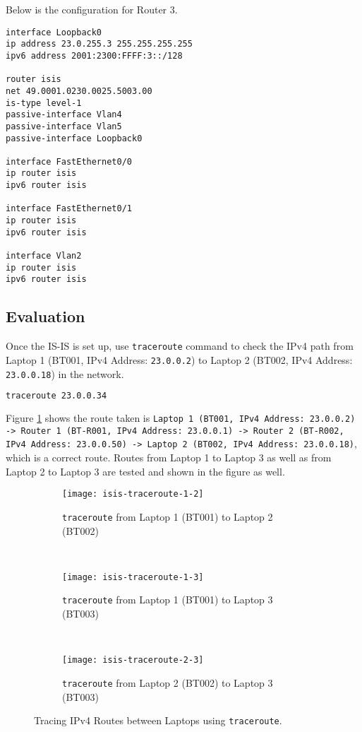 Below is the configuration for Router 3.

\begin{lstlisting}
interface Loopback0
ip address 23.0.255.3 255.255.255.255
ipv6 address 2001:2300:FFFF:3::/128

router isis
net 49.0001.0230.0025.5003.00
is-type level-1
passive-interface Vlan4
passive-interface Vlan5
passive-interface Loopback0

interface FastEthernet0/0
ip router isis
ipv6 router isis

interface FastEthernet0/1
ip router isis
ipv6 router isis

interface Vlan2
ip router isis
ipv6 router isis
\end{lstlisting}


\subsection{Evaluation}

Once the IS-IS is set up, use \texttt{traceroute} command to check the IPv4 path from Laptop 1 (BT001, IPv4 Address: \texttt{23.0.0.2}) to Laptop 2 (BT002, IPv4 Address: \texttt{23.0.0.18}) in the network.

\begin{lstlisting}[language=sh]
traceroute 23.0.0.34
\end{lstlisting}

Figure \ref{fig:isis-traceroute} shows the route taken is 
\texttt{Laptop 1 (BT001, IPv4 Address: 23.0.0.2)
-> Router 1 (BT-R001, IPv4 Address: 23.0.0.1) 
-> Router 2 (BT-R002, IPv4 Address: 23.0.0.50)
-> Laptop 2 (BT002, IPv4 Address: 23.0.0.18)}, which is a correct route.
Routes from Laptop 1 to Laptop 3 as well as from Laptop 2 to Laptop 3 are tested and shown in the figure as well.

\begin{figure}[ht!]
    \centering
    \begin{subfigure}[b]{\textwidth}
        \centering
        \texttt{[image: isis-traceroute-1-2]}
        \caption{\texttt{traceroute} from Laptop 1 (BT001) to Laptop 2 (BT002)}
    \end{subfigure}
    ~
    \begin{subfigure}[b]{\textwidth}
        \centering
        \texttt{[image: isis-traceroute-1-3]}
        \caption{\texttt{traceroute} from Laptop 1 (BT001) to Laptop 3 (BT003)}
    \end{subfigure}
    ~
    \begin{subfigure}[b]{\textwidth}
        \centering
        \texttt{[image: isis-traceroute-2-3]}
        \caption{\texttt{traceroute} from Laptop 2 (BT002) to Laptop 3 (BT003)}
    \end{subfigure}
    \caption{Tracing IPv4 Routes between Laptops using \texttt{traceroute}.}
    \label{fig:isis-traceroute}
\end{figure}

